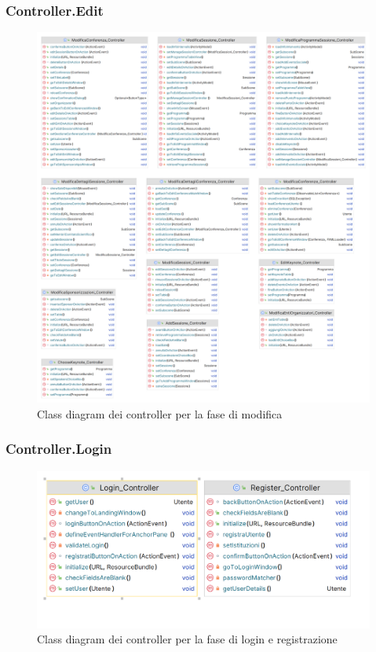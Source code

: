 \subsubsection{Controller.Edit}
\begin{figure}[h!]
	\includegraphics[scale=0.17]{Immagini/Controller_Modifica.png}
	\caption{Class diagram dei controller per la fase di modifica}
\end{figure}
\newpage
\subsubsection{Controller.Login}
\begin{figure}[h!]
	\includegraphics[scale=0.25]{Immagini/Controller_Login.png}
	\caption{Class diagram dei controller per la fase di login e registrazione}
\end{figure}

